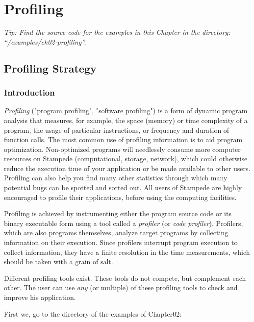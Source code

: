 \chapter{Profiling}
\label{ch:ch02_profiling}

\renewcommand{\exampledir}{examples/ch02-profiling}
\emph{Tip: Find the source code for the examples in this Chapter in the directory:  ``\tilde/\exampledir''.}

\section{Profiling Strategy}
\label{sec:Profiling_Strategy}

\subsection{Introduction}
\label{subsec:Introduction}

\emph{Profiling} ("program profiling", "software profiling") is a form of dynamic program analysis that measures, for example, the space (memory) or time complexity of a program, the usage of particular instructions, or frequency and duration of function calls. The most common use of profiling information is to aid program optimization. Non-optimized programs will needlessly consume more computer resources on Stampede (computational, storage, network), which could otherwise reduce the execution time of your application or be made available to other users. Profiling can also help you find many other statistics through which many potential bugs can be spotted and sorted out. All users of Stampede are highly encouraged to profile their applications, before using the computing facilities.

Profiling is achieved by instrumenting either the program source code or its binary executable form using a tool called a \emph{profiler} (or \emph{code profiler}). Profilers, which are also programs themselves, analyze target programs by collecting information on their execution. Since profilers interrupt program execution to collect information, they have a finite resolution in the time measurements, which should be taken with a grain of salt.

Different profiling tools exist. These tools do not compete, but complement each other. The user can use \emph{any} (or multiple) of these profiling tools to check and improve his application.

First we, go to the directory of the examples of Chapter02:

